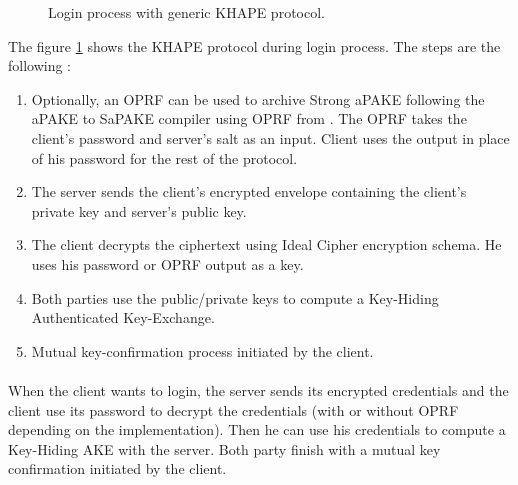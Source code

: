 ﻿\documentclass[../report.tex]{subfiles}
\begin{document}
\begin{figure}[h]
 \centering
 
 \setlength{\fboxsep}{10pt}
 \setlength{\fboxrule}{1pt}
 
 \caption{Login process with generic KHAPE protocol.}
 \label{fig:Generic_KHAPE}
\end{figure}


The figure \ref{fig:Generic_KHAPE} shows the KHAPE protocol during login process.
The steps are the following :


\begin{enumerate}
 \item Optionally, an OPRF can be used to archive Strong aPAKE following the aPAKE to SaPAKE compiler using OPRF from \cite{OPAQUE_Paper}. The OPRF takes the client's password and server's salt as an input. Client uses the output in place of his password for the rest of the protocol.
 \item The server sends the client's encrypted envelope containing the client's private key and server's public key.
 \item The client decrypts the ciphertext using Ideal Cipher encryption schema. He uses his password or OPRF output as a key.
 \item Both parties use the public/private keys to compute a Key-Hiding Authenticated Key-Exchange.
 \item Mutual key-confirmation process initiated by the client.
\end{enumerate}


\paragraph{}
When the client wants to login, the server sends its encrypted credentials and the client use its password to decrypt the credentials (with or without OPRF depending on the implementation). Then he can use his credentials to compute a Key-Hiding AKE with the server.
Both party finish with a mutual key confirmation initiated by the client.
\end{document}
